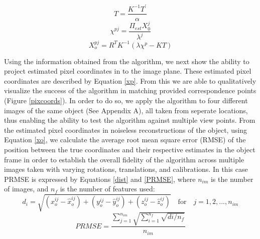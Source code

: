 \documentclass[12pt]{article}
\begin{document}
\begin{multicols}{3}
	
	\begin{equation}\label{Teq}
		T = \dfrac{K^{-1}T^{'}}{\alpha}
	\end{equation}\break
	\noindent
	\begin{equation}\label{xp}
		\chi^{pj} = \dfrac{\Pi_{est} X_0^j}{\lambda^j}
	\end{equation}\break
	\noindent
	\begin{equation}\label{xo}
	X_o^{pj} = R^TK^{-1}(\lambda\chi^p-KT)
	\end{equation}\break
\end{multicols}
Using the information obtained from the algorithm, we next show the ability to project estimated pixel coordinates in to the image plane. These estimated pixel coordinates are described by Equation \ref{xp}.  From this we are able to qualitatively visualize the success of the algorithm in matching provided correspondence points (Figure \ref{pixcoords}). In order to do so, we apply the algorithm to four different images of the same object (See Appendix A), all taken from seperate locations, thus enabling the ability to test the algorithm against multiple view points. From the estimated pixel coordinates in noiseless reconstructions of the object, using Equation \ref{xo}, we calculate the average root mean square error (RMSE) of the position between the true coordinates and their respective estimates in the object frame in order to establish the overall fidelity of the algorithm across multiple images taken with varying rotations, translations, and calibrations. In this case PRMSE is expressed by Equations \ref{dist} and \ref{PRMSE}, where $n_{im}$ is the number of images, and $n_{f} $ is the number of features used:
\begin{equation}\label{dist}
d_i = \sqrt{(x_o^{ij}-\hat{x}_o^{ij})+(y_o^{ij}-\hat{y}_o^{ij})+(z_o^{ij}-\hat{z}_o^{ij})}\quad \text{for} \quad j=1,2,...,n_{im}
\end{equation}
\begin{equation}\label{PRMSE}
	PRMSE =\dfrac{\sum_{j=1}^{n_{im}}\sqrt{\sum_{i=1}^{n_f}\sqrt{di/n_f}}}{n_{im}}
\end{equation}
\end{document}
